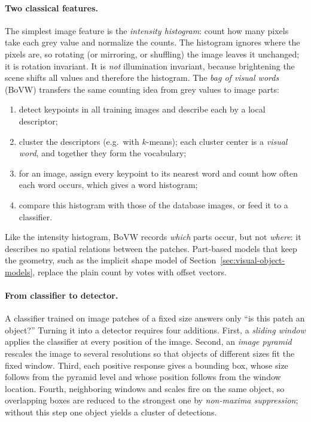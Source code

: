 \paragraph{Two classical features.}
The simplest image feature is the \emph{intensity histogram}: count how many
pixels take each grey value and normalize the counts. The histogram ignores
where the pixels are, so rotating (or mirroring, or shuffling) the image leaves
it unchanged; it is rotation invariant. It is \emph{not} illumination invariant,
because brightening the scene shifts all values and therefore the histogram.
The \emph{bag of visual words} (BoVW) transfers the same counting idea from grey
values to image parts:
\begin{enumerate}
  \item detect keypoints in all training images and describe each by a local
        descriptor;
  \item cluster the descriptors (e.g.\ with $k$-means); each cluster center is a
        \emph{visual word}, and together they form the vocabulary;
  \item for an image, assign every keypoint to its nearest word and count how
        often each word occurs, which gives a word histogram;
  \item compare this histogram with those of the database images, or feed it to
        a classifier.
\end{enumerate}
\noindent
Like the intensity histogram, BoVW records \emph{which} parts occur, but not
\emph{where}: it describes no spatial relations between the patches. Part-based
models that keep the geometry, such as the implicit shape model of
Section~\ref{sec:visual-object-models}, replace the plain count by votes with
offset vectors.

\paragraph{From classifier to detector.}
A classifier trained on image patches of a fixed size answers only ``is this
patch an object?'' Turning it into a detector requires four additions. First,
a \emph{sliding window} applies the classifier at every position of the image.
Second, an \emph{image pyramid} rescales the image to several resolutions so
that objects of different sizes fit the fixed window. Third, each positive
response gives a bounding box, whose size follows from the pyramid level and
whose position follows from the window location. Fourth, neighboring windows
and scales fire on the same object, so overlapping boxes are reduced to the
strongest one by \emph{non-maxima suppression}; without this step one object
yields a cluster of detections.

